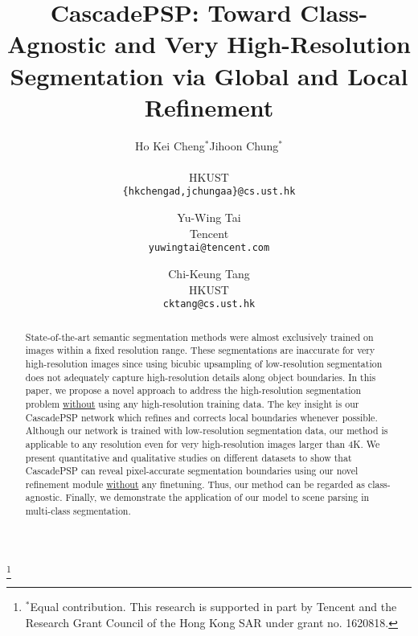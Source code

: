 \documentclass[10pt,twocolumn,letterpaper]{article}
\newcommand\blfootnote[1]{\begingroup
  \renewcommand\thefootnote{}\footnote{#1}\addtocounter{footnote}{-1}\endgroup
}
\begin{document}
\title{CascadePSP: Toward Class-Agnostic and Very High-Resolution Segmentation via Global and Local Refinement}

\author{
\begin{tabular}{cc}
Ho Kei Cheng$^*$ & Jihoon Chung$^*$
\end{tabular}\\
HKUST\\
{\tt\small \{hkchengad,jchungaa\}@cs.ust.hk}
\and
Yu-Wing Tai\\
Tencent\\
{\tt\small yuwingtai@tencent.com}
\and
Chi-Keung Tang\\
HKUST\\
{\tt\small cktang@cs.ust.hk}
}

\maketitle

\begin{abstract}
State-of-the-art semantic segmentation methods were almost exclusively trained on images within a fixed resolution range. These segmentations are inaccurate for very high-resolution images since using bicubic upsampling of low-resolution segmentation does not adequately capture high-resolution details along object boundaries.
In this paper, we propose a novel approach to address the high-resolution segmentation problem \underline{without} using any high-resolution training data. 
The key insight is our CascadePSP network which refines and corrects local boundaries whenever possible. 
Although our network is trained with low-resolution segmentation data, our method is applicable to any resolution even for very high-resolution images larger than 4K.
We present quantitative and qualitative studies on different datasets to show that CascadePSP can reveal pixel-accurate segmentation boundaries using our novel refinement module \underline{without} any finetuning. Thus, our method can be regarded as class-agnostic.
Finally, we demonstrate the application of our model to scene parsing in multi-class segmentation.
\end{abstract}

\vspace{-2em}

\blfootnote{
$^*$Equal contribution.
This research is supported in part by Tencent and the Research Grant Council of the Hong Kong SAR under grant no. 1620818.}
\end{document}
